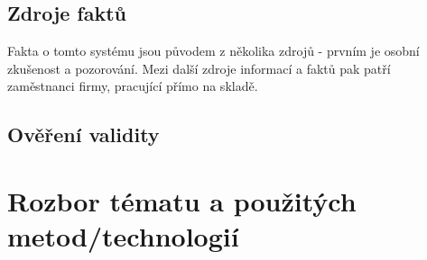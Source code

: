 \documentclass[11pt]{article}
\begin{document}
	\subsection{Zdroje faktů}
	Fakta o tomto systému jsou původem z několika zdrojů - prvním je osobní zkušenost a pozorování.
	Mezi další zdroje informací a faktů pak patří zaměstnanci firmy, pracující přímo na skladě.


	\subsection{Ověření validity}

	\newpage
	\section{Rozbor tématu a použitých metod/technologií} \label{sec:rozbor}
\end{document}
